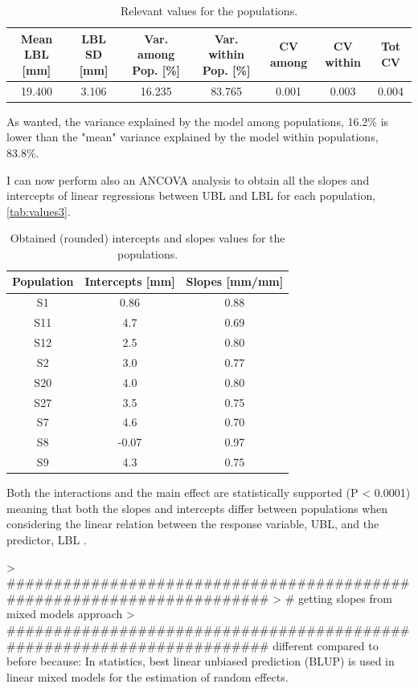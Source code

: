 \documentclass{article}
\begin{document}
\begin{table}[H]
\centering
\caption{Relevant values for the populations.}
\begin{tabular}{c c c c c c c } 
 \hline
 Mean LBL [mm]& LBL SD [mm]&Var. among Pop. [\%]&Var. within Pop. [\%]&CV among& CV within& Tot CV  \\  
 \hline
 19.400&3.106&16.235&83.765&0.001&0.003&0.004 \\
 \hline
\end{tabular}
\label{tab:values2}
\end{table}
As wanted, the variance explained by the model among populations, 16.2\% is lower than the "mean" variance explained by the model within populations, 83.8\%.

I can now perform also an ANCOVA analysis to obtain all the slopes and intercepts of linear regressions between UBL and LBL for each population, \autoref{tab:values3}.
\begin{table}[H]
\centering
\caption{Obtained (rounded) intercepts and slopes values for the populations.}
\begin{tabular}{c c c} 
 \hline
Population & Intercepts [mm] & Slopes [mm/mm] \\  
 \hline
 S1 &0.86&0.88 \\
 S11 &4.7&0.69 \\
 S12 &2.5&0.80 \\
 S2 &3.0&0.77 \\
 S20 &4.0&0.80 \\
 S27 &3.5&0.75\\
 S7 &4.6&0.70 \\
 S8 &-0.07&0.97 \\
 S9 &4.3&0.75\\
 \hline
\end{tabular}
\label{tab:values3}
\end{table}
Both the interactions and the main effect are statistically supported (P < 0.0001) meaning that both the slopes and intercepts differ between populations when considering the linear relation between the response variable, UBL, and the predictor, LBL .

\iffalse
> #######################################################################
> # getting slopes from mixed models approach
> #######################################################################
different compared to before because:
In statistics, best linear unbiased prediction (BLUP) is used in linear mixed models for the estimation of random effects.
\end{document}

